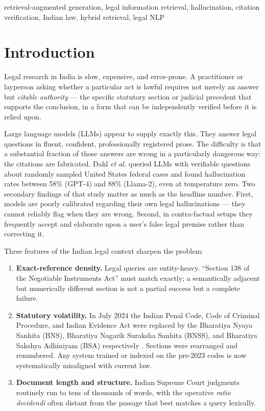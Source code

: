\documentclass[conference]{IEEEtran}
\begin{document}
\begin{IEEEkeywords}
retrieval-augmented generation, legal information retrieval, hallucination, citation verification, Indian law, hybrid retrieval, legal NLP
\end{IEEEkeywords}

\section{Introduction}

Legal research in India is slow, expensive, and error-prone. A practitioner or layperson asking whether a particular act is lawful requires not merely an answer but \emph{citable authority} — the specific statutory section or judicial precedent that supports the conclusion, in a form that can be independently verified before it is relied upon.

Large language models (LLMs) appear to supply exactly this. They answer legal questions in fluent, confident, professionally registered prose. The difficulty is that a substantial fraction of those answers are wrong in a particularly dangerous way: the citations are fabricated. Dahl \textit{et al.} \cite{dahl2024} queried LLMs with verifiable questions about randomly sampled United States federal cases and found hallucination rates between 58\% (GPT-4) and 88\% (Llama-2), even at temperature zero. Two secondary findings of that study matter as much as the headline number. First, models are poorly calibrated regarding their own legal hallucinations — they cannot reliably flag when they are wrong. Second, in contra-factual setups they frequently accept and elaborate upon a user's false legal premise rather than correcting it.

Three features of the Indian legal context sharpen the problem:

\begin{enumerate}
\item \textbf{Exact-reference density.} Legal queries are entity-heavy. ``Section 138 of the Negotiable Instruments Act'' must match exactly; a semantically adjacent but numerically different section is not a partial success but a complete failure.
\item \textbf{Statutory volatility.} In July 2024 the Indian Penal Code, Code of Criminal Procedure, and Indian Evidence Act were replaced by the Bharatiya Nyaya Sanhita (BNS), Bharatiya Nagarik Suraksha Sanhita (BNSS), and Bharatiya Sakshya Adhiniyam (BSA) respectively \cite{dixit2025}. Sections were rearranged and renumbered. Any system trained or indexed on the pre-2023 codes is now systematically misaligned with current law.
\item \textbf{Document length and structure.} Indian Supreme Court judgments routinely run to tens of thousands of words, with the operative \textit{ratio decidendi} often distant from the passage that best matches a query lexically.
\end{enumerate}
\end{document}
